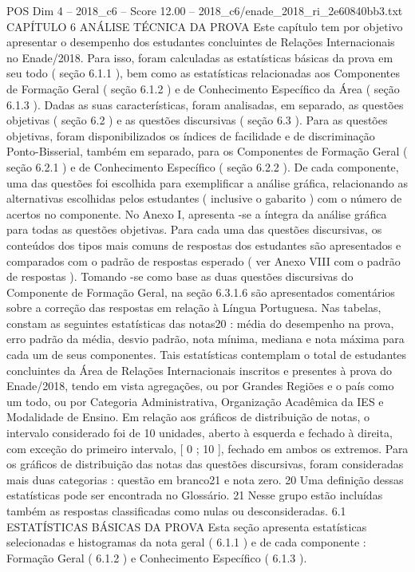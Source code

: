 \begin{textsample}{POS Dim 4 – 2018\_c6 – Score 12.00 – 2018\_c6/enade\_2018\_ri\_2e60840bb3.txt}  \label{ex:f4_pos_018}
CAPÍTULO 6 ANÁLISE TÉCNICA DA PROVA Este capítulo tem por objetivo apresentar o desempenho dos estudantes concluintes de Relações Internacionais no Enade/2018.
Para isso, foram calculadas as estatísticas básicas da prova em seu todo ( seção 6.1.1 ), bem como as estatísticas relacionadas aos Componentes de Formação Geral ( seção 6.1.2 ) e de Conhecimento Específico da Área ( seção 6.1.3 ).
Dadas as suas características, foram analisadas, em separado, as questões objetivas ( seção 6.2 ) e as questões discursivas ( seção 6.3 ).
Para as questões objetivas, foram disponibilizados os índices de facilidade e de discriminação Ponto-Bisserial, também em separado, para os Componentes de Formação Geral ( seção 6.2.1 ) e de Conhecimento Específico ( seção 6.2.2 ).
De cada componente, uma das questões foi escolhida para exemplificar a análise gráfica, relacionando as alternativas escolhidas pelos estudantes ( inclusive o gabarito ) com o número de acertos no componente.
No Anexo I, apresenta -se a íntegra da análise gráfica para todas as questões objetivas.
Para cada uma das questões discursivas, os conteúdos dos tipos mais comuns de respostas dos estudantes são apresentados e comparados com o padrão de respostas esperado ( ver Anexo VIII com o padrão de respostas ).
Tomando -se como base as duas questões discursivas do Componente de Formação Geral, na seção 6.3.1.6 são apresentados comentários sobre a correção das respostas em relação à Língua Portuguesa.
Nas tabelas, constam as seguintes estatísticas das notas20 : média do desempenho na prova, erro padrão da média, desvio padrão, nota mínima, mediana e nota máxima para cada um de seus componentes.
Tais estatísticas contemplam o total de estudantes concluintes da Área de Relações Internacionais inscritos e presentes à prova do Enade/2018, tendo em vista agregações, ou por Grandes Regiões e o país como um todo, ou por Categoria Administrativa, Organização Acadêmica da IES e Modalidade de Ensino.
Em relação aos gráficos de distribuição de notas, o intervalo considerado foi de 10 unidades, aberto à esquerda e fechado à direita, com exceção do primeiro intervalo, [ 0 ; 10 ], fechado em ambos os extremos.
Para os gráficos de distribuição das notas das questões discursivas, foram consideradas mais duas categorias : questão em branco21 e nota zero. 20 Uma definição dessas estatísticas pode ser encontrada no Glossário. 21 Nesse grupo estão incluídas também as respostas classificadas como nulas ou desconsideradas. 6.1 ESTATÍSTICAS BÁSICAS DA PROVA Esta seção apresenta estatísticas selecionadas e histogramas da nota geral ( 6.1.1 ) e de cada componente : Formação Geral ( 6.1.2 ) e Conhecimento Específico ( 6.1.3 ).

\end{textsample}
